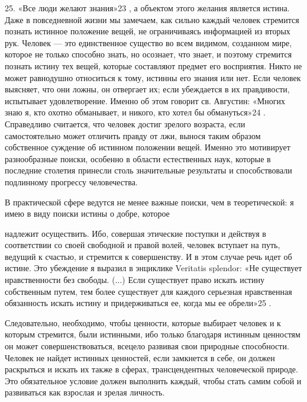 \documentclass[a5paper,10pt]{article}
\begin{document}
25. «Все люди желают знания»23 , а объектом этого желания является истина. Даже
в повседневной жизни мы замечаем, как сильно каждый человек стремится познать
истинное положение вещей, не ограничиваясь информацией из вторых рук. Человек —
это единственное существо во всем видимом, созданном мире, которое не только
способно знать, но осознает, что знает, и поэтому стремится познать истину тех
вещей, которые составляют предмет его восприятия. Никто не может равнодушно
относиться к тому, истинны его знания или нет. Если человек выясняет, что они
ложны, он отвергает их; если убеждается в их правдивости, испытывает
удовлетворение. Именно об этом говорит св. Августин: «Многих знаю я, кто охотно
обманывает, и никого, кто хотел бы обмануться»24 . Справедливо считается, что
человек достиг зрелого возраста, если самостоятельно может отличить правду от
лжи, вынося таким образом собственное суждение об истинном положении вещей.
Именно это мотивирует разнообразные поиски, особенно в области естественных
наук, которые в последние столетия принесли столь значительные результаты и
способствовали подлинному прогрессу человечества.

В практической сфере ведутся не менее важные поиски, чем в теоретической: я
имею в виду поиски истины о добре, которое

надлежит осуществить. Ибо, совершая этические поступки и действуя в
соответствии со своей свободной и правой волей, человек вступает на путь,
ведущий к счастью, и стремится к совершенству. И в этом случае речь идет об
истине. Это убеждение я выразил в энциклике Veritatis splendor: «Не существует
нравственности без свободы. (...) Если существует право искать истину
собственным путем, тем более существует для каждого серьезная нравственная
обязанность искать истину и придерживаться ее, когда мы ее обрели»25 .

Следовательно, необходимо, чтобы ценности, которые выбирает человек и к которым
стремится, были истинными, ибо только благодаря истинным ценностям он может
совершенствоваться, всецело развивая свои природные способности. Человек не
найдет истинных ценностей, если замкнется в себе, он должен раскрыться и искать
их также в сферах, трансцендентных человеческой природе. Это обязательное
условие должен выполнить каждый, чтобы стать самим собой и развиваться как
взрослая и зрелая личность.
\end{document}
